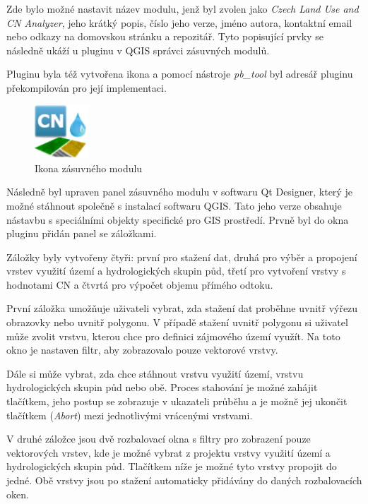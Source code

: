 \documentclass[a4paper,oneside,12pt]{book}
\begin{document}
\hspace{10mm} Zde bylo možné nastavit název modulu, jenž byl zvolen jako \textit{Czech Land Use and CN Analyzer}, jeho krátký popis, číslo jeho verze, jméno autora, kontaktní email nebo odkazy na domovskou stránku a repozitář. Tyto popisující prvky se následně ukáží u pluginu v QGIS správci zásuvných modulů.

\hspace{10mm} Pluginu byla též vytvořena ikona a pomocí nástroje \textit{pb\_tool} byl adresář pluginu překompilován pro její implementaci.

\begin{figure}[H] \label{obr12}
\centering
\includegraphics[height=2cm]{pictures/icon.png}
\caption{Ikona zásuvného modulu}
\label{fig:icon}
\end{figure}

\hspace{10mm} Následně byl upraven panel zásuvného modulu v softwaru Qt Designer, který je možné stáhnout společně s instalací softwaru QGIS. Tato jeho verze obsahuje nástavbu s speciálními objekty specifické pro GIS prostředí. Prvně byl do okna pluginu přidán panel se záložkami.

\hspace{10mm} Záložky byly vytvořeny čtyři: první pro stažení dat, druhá pro výběr a propojení vrstev využití území a hydrologických skupin půd, třetí pro vytvoření vrstvy s hodnotami CN a čtvrtá pro výpočet objemu přímého odtoku.

\hspace{10mm} První záložka umožňuje uživateli vybrat, zda stažení dat proběhne uvnitř výřezu obrazovky nebo uvnitř polygonu. V případě stažení uvnitř polygonu si uživatel může zvolit vrstvu, kterou chce pro definici zájmového území využít. Na toto okno je nastaven filtr, aby zobrazovalo pouze vektorové vrstvy.

\hspace{10mm} Dále si může vybrat, zda chce stáhnout vrstvu využití území, vrstvu hydrologických skupin půd nebo obě.  Proces stahování je možné zahájit tlačítkem, jeho postup se zobrazuje v ukazateli průběhu a je možně jej ukončit tlačítkem (\textit{Abort}) mezi jednotlivými vrácenými vrstvami.  

\hspace{10mm} V druhé záložce jsou dvě rozbalovací okna s filtry pro zobrazení pouze vektorových vrstev, kde je možné vybrat z projektu vrstvy využití území a hydrologických skupin půd. Tlačítkem níže je možné tyto vrstvy propojit do jedné. Obě vrstvy jsou po stažení automaticky přidávány do daných rozbalovacích oken.
\end{document}
